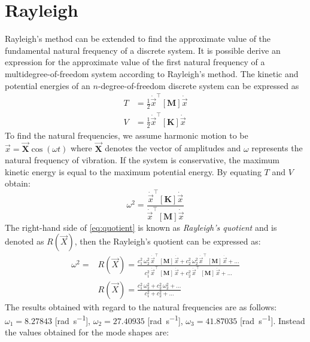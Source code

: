 \section{Rayleigh}
\label{sec:ray}
Rayleigh's method can be extended to find the approximate value of the fundamental
natural frequency of a discrete system.
It is possible derive an expression for the approximate value of the first
natural frequency of a multidegree-of-freedom system according to Rayleigh's
method.
The kinetic and potential energies of an \(n\)-degree-of-freedom discrete system
can be expressed as
\begin{align}\label{eq:energyequation}
  T &= \frac{1}{2}\dot{\vec{x}}^{\top}[\mathbf{M}]\dot{\vec{x}}\\[1em]
  V &= \frac{1}{2}\dot{\vec{x}}^{\top}[\mathbf{K}]\dot{\vec{x}}
\end{align}
%
To find the natural frequencies, we assume harmonic motion to be
\(\vec{x} = \vec{\mathbf{X}} \cos(\omega t)\) where \(\vec{\mathbf{X}}\) denotes
the vector of amplitudes and \(\omega\) represents the natural frequency of
vibration.
If the system is conservative, the maximum kinetic energy is equal to the
maximum potential energy. By equating \(T\) and \(V\) obtain:
\begin{equation}\label{eq:quotient}
  \omega^2 = \frac{\dot{\vec{x}}^{\top}[\mathbf{K}]\dot{\vec{x}}}
  {\dot{\vec{x}}^{\top}[\mathbf{M}]\dot{\vec{x}}}
\end{equation}
%
The right-hand side of \eqref{eq:quotient} is known as \emph{Rayleigh's quotient}
and is denoted as \(R(\vec{X})\), then the Rayleigh's quotient can be expressed
as:
\begin{align}
  \omega^{2} =& R(\vec{X}) =
  \frac{
          c_{1}^{2}\,\omega_{2}^{2}\,\dot{\vec{x}}^{\top}\,[\mathbf{M}]\,\dot{\vec{x}} +
          c_{2}^{2}\,\omega_{2}^{2}\,\dot{\vec{x}}^{\top}\,[\mathbf{M}]\,\dot{\vec{x}} + \dots}
       {
          c_{1}^{2}\,\dot{\vec{x}}^{\top}\,[\mathbf{M}]\,\dot{\vec{x}} +
          c_{2}^{2}\,\dot{\vec{x}}^{\top}\,[\mathbf{M}]\,\dot{\vec{x}} + \dots
        }\\[1.5em]
      &  R(\vec{X}) =
      \frac{c_{1}^{2}\,\omega_{2}^{2} + c_{2}^{2}\,\omega_{2}^{2} + \dots}
           {c_{1}^{2} + c_{2}^{2} + \dots}
\end{align}
The results obtained with regard to the natural frequencies are as follows:
\(\omega_{1} = 8.27843\) [\si{\radian\per\second}],
\(\omega_{2} = 27.40935\) [\si{\radian\per\second}],
\(\omega_{3} = 41.87035\) [\si{\radian\per\second}].
Instead the values obtained for the mode shapes are:
